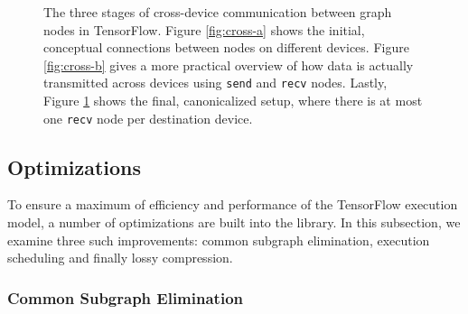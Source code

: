 \begin{figure}
\begin{subfigure}[h]{0.30\textwidth}
    \caption{}
    \label{fig:cross-c}
  \end{subfigure}
  \caption{The three stages of cross-device communication between graph nodes in
    TensorFlow. Figure \ref{fig:cross-a} shows the initial, conceptual
    connections between nodes on different devices. Figure \ref{fig:cross-b}
    gives a more practical overview of how data is actually transmitted across
    devices using \texttt{send} and \texttt{recv} nodes. Lastly, Figure
    \ref{fig:cross-c} shows the final, canonicalized setup, where there is at
    most one \texttt{recv} node per destination device.}
  \label{fig:cross}
\end{figure}

\subsection{Optimizations}\label{sec:model-optim}

To ensure a maximum of efficiency and performance of the TensorFlow execution
model, a number of optimizations are built into the library. In this subsection,
we examine three such improvements: common subgraph elimination, execution
scheduling and finally lossy compression.

\subsubsection{Common Subgraph Elimination}\label{sec:model-optim-common}

